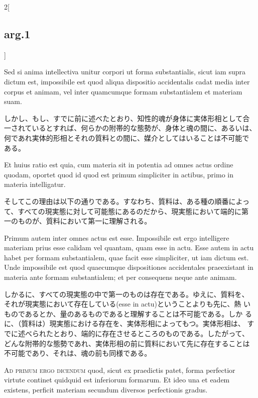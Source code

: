 \documentclass[paper=a4paper,fontsize=10pt,jafontsize=9pt,titlepage]{jlreq}
\begin{document}
\begin{paracol}{2}[\subsection{arg.1}]
\switchcolumn*

 Sed si anima intellectiva unitur corpori ut forma substantialis,
 sicut iam supra dictum est, impossibile est quod aliqua dispositio
 accidentalis cadat media inter corpus et animam, vel inter quamcumque
 formam substantialem et materiam suam.
 
\switchcolumn

しかし、もし、すでに前に述べたとおり、知性的魂が身体に実体形相として合
一されているとすれば、何らかの附帯的な態勢が、身体と魂の間に、あるいは、
何であれ実体的形相とそれの質料との間に、媒介としてはいることは不可能で
ある。
 
\switchcolumn*

 Et huius ratio est quia, cum materia sit in potentia ad omnes actus
 ordine quodam, oportet quod id quod est primum simpliciter in
 actibus, primo in materia intelligatur. 

\switchcolumn

そしてこの理由は以下の通りである。すなわち、質料は、ある種の順番によっ
て、すべての現実態に対して可能態にあるのだから、現実態において端的に第
一のものが、質料において第一に理解される。
 
\switchcolumn*

Primum autem inter omnes actus est esse.  Impossibile est ergo
 intelligere materiam prius esse calidam vel quantam, quam esse in
 actu. Esse autem in actu habet per formam substantialem, quae facit
 esse simpliciter, ut iam dictum est. Unde impossibile est quod
 quaecumque dispositiones accidentales praeexistant in materia ante
 formam substantialem; et per consequens neque ante animam.

\switchcolumn

しかるに、すべての現実態の中で第一のものは存在である。ゆえに、質料を、
それが現実態において存在している(esse in actu)ということよりも先に、熱
いものであるとか、量のあるものであると理解することは不可能である。しか
るに、（質料は）現実態における存在を、実体形相によってもつ。実体形相は、
すでに述べられたとおり、端的に存在させるところのものである。したがって、
どんな附帯的な態勢であれ、実体形相の前に質料において先に存在することは
不可能であり、それは、魂の前も同様である。
 
\switchcolumn*[\subsection{ad 1}]



{\scshape Ad primum ergo dicendum} quod, sicut ex praedictis patet,
forma perfectior virtute continet quidquid est inferiorum formarum. Et
ideo una et eadem existens, perficit materiam secundum diversos
 perfectionis gradus.



\end{paracol}
\end{document}
